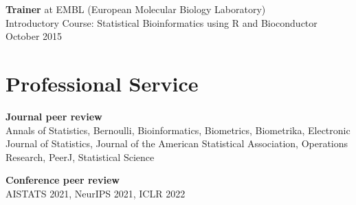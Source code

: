 \documentclass[margin,line]{res}
\newcommand{\ver}{\vspace*{-2.7mm}}
\begin{document}
\begin{resume}
\ver
\textbf{Trainer} at EMBL (European Molecular Biology Laboratory)\\
Introductory Course: Statistical Bioinformatics using R and Bioconductor \hfill October 2015




\section{\sc Professional Service}

\textbf{Journal peer review}\\
Annals of Statistics, Bernoulli, Bioinformatics, Biometrics, Biometrika, Electronic Journal of Statistics, Journal of the American Statistical Association, Operations Research, PeerJ, Statistical Science

\ver
\textbf{Conference peer review}\\
AISTATS 2021, NeurIPS 2021, ICLR 2022







\end{resume}
\end{document}
